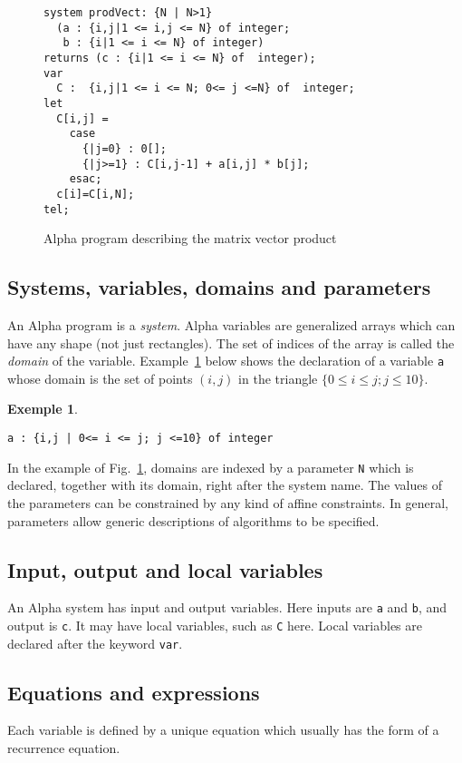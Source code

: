 \documentclass[12pt]{article}
\newcommand{\Alpha}{{\sc Alpha}}
\newcommand{\alfa}{\Alpha}
\newtheorem{ex}{Exemple}[section]
\begin{document}
\begin{figure}[htbp]
\begin{verbatim}
system prodVect: {N | N>1}
  (a : {i,j|1 <= i,j <= N} of integer; 
   b : {i|1 <= i <= N} of integer)
returns (c : {i|1 <= i <= N} of  integer);
var 
  C :  {i,j|1 <= i <= N; 0<= j <=N} of  integer;
let
  C[i,j] = 
    case
      {|j=0} : 0[];
      {|j>=1} : C[i,j-1] + a[i,j] * b[j];
    esac;
  c[i]=C[i,N];
tel;   
\end{verbatim}
\caption{{\Alpha} program describing the matrix vector product}
\label{fig1}
\end{figure}


\subsection*{Systems, variables, domains and parameters}
An {\Alpha} program is a {\em system}. \alfa{} variables are generalized
arrays which can have any shape (not just rectangles).  The set of
indices of the array is called the {\em domain} of the variable.
Example~\ref{ex1} below shows the declaration of a variable {\tt a}
whose domain is the set of points $(i,j)$ in the triangle 
$\{0 \leq i \leq j;j \leq 10\}$.
\begin{ex}{~}
\begin{verbatim}
a : {i,j | 0<= i <= j; j <=10} of integer
\end{verbatim}
\label{ex1}
\end{ex} 
In the example of Fig.~\ref{fig1}, domains are indexed
by a parameter \texttt{N} which is declared, together with its
domain, right after the system name. The values of the parameters
can be constrained by any kind of 
affine constraints. In 
general, parameters allow generic descriptions of algorithms to 
be specified. 

\subsection*{Input, output and local variables}
An \alfa{} system has input and output variables. 
Here inputs are \texttt{a} and \texttt{b}, and output
is \texttt{c}.
It may have local
variables, such as \texttt{C} here. Local variables are
declared after the keyword \texttt{var}.

\subsection*{Equations and expressions}
Each variable is defined by a unique equation which
usually has the form of a recurrence equation. 
\end{document}

